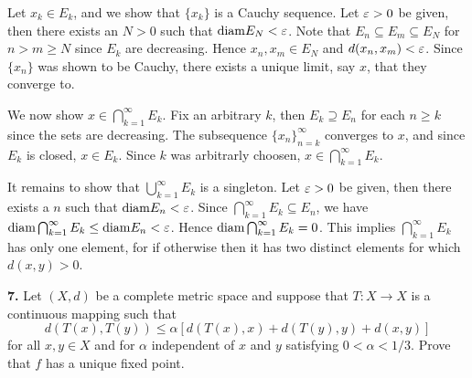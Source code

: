 \documentclass{homework}
\begin{document}
\begin{solution}
  Let $x_k \in E_k$, and we show that $\{x_k\}$ is a Cauchy sequence.  Let
  $\varepsilon >0$ be given, then there exists an $N>0$ such that $\mathrm{diam} E_N < \varepsilon$.
  Note that $E_n \subseteq E_m \subseteq E_N$ for $n>m\ge N$ since $E_k$ are
  decreasing.  Hence $x_n,x_m \in E_N$ and $d(x_n,x_m) < \varepsilon$.  Since
  $\{x_n\}$ was shown to be Cauchy, there exists a unique limit, say $x$, that
  they converge to.  
  
  We now show $x \in \bigcap_{k=1}^\infty E_k$.  Fix an arbitrary $k$, then $E_k \supseteq E_n$
  for each $n \ge k$ since the sets are decreasing.  The subsequence $\{x_n\}_{n=k}^\infty$ converges
    to $x$, and since $E_k$ is closed, $x \in E_k$.  Since $k$ was arbitrarly choosen,
    $x\in\bigcap_{k=1}^\infty E_k$.

  It remains to show that $\bigcup_{k=1}^\infty E_k$ is a singleton.  Let $\varepsilon > 0$ be given, then there
  exists a $n$ such that $\mathrm{diam} E_n < \varepsilon$.  Since $\bigcap_{k=1}^\infty E_k \subseteq E_n$, we have
  $\mathrm{diam} \bigcap_{k=1}^\infty E_k \le \mathrm{diam} E_n < \varepsilon$.  Hence $\mathrm{diam} \bigcap_{k=1}^\infty E_k = 0$. This
  implies $\bigcap_{k=1}^\infty E_k$ has only one element, for if otherwise then it has two distinct elements
  for which $d(x,y) > 0$.
\end{solution}

{\bf 7.} Let $(X,d)$ be a complete metric space and suppose that $T:X\to X$ is a continuous mapping such that
$$
  d(T(x),T(y)) \le \alpha[d(T(x),x) + d(T(y),y) + d(x,y)]
$$
for all $x,y \in X$ and for $\alpha$ independent of $x$ and $y$ satisfying $0< \alpha <1/3$.  Prove that $f$ has a unique fixed point.
\end{document}
